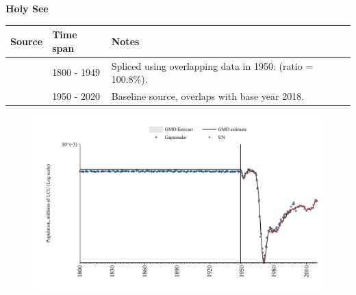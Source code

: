\documentclass[12pt,a4paper,landscape]{article}
\begin{document}
\begin{adjustbox}{max totalsize={\paperwidth}{\paperheight},center}
\begin{minipage}[t][\textheight][t]{\textwidth}
\vspace*{0.5cm}
{}
\begin{center}
{\Large\bfseries Holy See}
\end{center}
\vspace{0.5cm}
\begin{table}[H]
\centering
\small
\begin{tabular}{|l|l|l|}
\hline
\textbf{Source} & \textbf{Time span} & \textbf{Notes} \\
\hline
\rowcolor{white}\cite{Gapminder}& 1800 - 1949 &Spliced using overlapping data in 1950: (ratio = 100.8\%).\\
\rowcolor{lightgray}\cite{UN}& 1950 - 2020 &Baseline source, overlaps with base year 2018.\\
\hline
\end{tabular}
\end{table}
\begin{figure}[H]
\centering
\includegraphics[width=\textwidth,height=0.6\textheight,keepaspectratio]{graphs/VAT_pop.pdf}
\end{figure}
\end{minipage}
\end{adjustbox}
\end{document}
